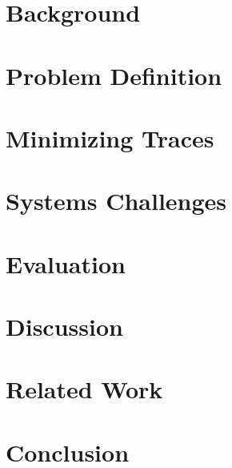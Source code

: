 \documentclass{sig-alternate-10pt}
\begin{document}
\section{Background}
\label{sec:overview}


\section{Problem Definition}
\label{sec:formalism}


\section{Minimizing Traces}
\label{sec:approach}


\section{Systems Challenges}
\label{sec:architecture}
\label{sec:systems_challenges}


\section{Evaluation}
\label{sec:evaluation}


\section{Discussion}
\label{sec:discussion}


\section{Related Work}
\label{sec:related_work}


\section{Conclusion}
\label{sec:conclusion}



\renewcommand{\baselinestretch}{0.89}
\footnotesize{}

%

\end{document}
